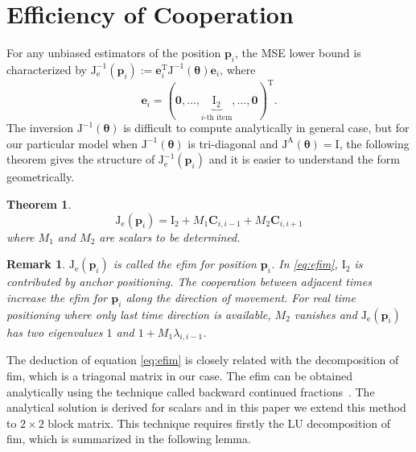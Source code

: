 \documentclass[conference]{IEEEtran}
\newtheorem{theorem}{Theorem}
\newtheorem{remark}{Remark}
\begin{document}
\section{Efficiency of Cooperation}\label{efficiency}
For any unbiased estimators of the position $\bm{p}_i$, the MSE lower bound is characterized by $\bm{\mathrm{J}}^{-1}_{\mathrm{e}}(\bm{p}_i):=\bm{e}_i^{\textrm{T}}\bm{\mathrm{J}}^{-1}(\bm{\theta})\bm{e}_i$, where
\begin{equation}
\bm{e}_i=(\bm{0},\dots,\underbrace{\bm{\mathrm{I}}_2}_{\text{$i$-th item}},\dots,\bm{0})^{\textrm{T}}.
\end{equation}
The inversion $\bm{\mathrm{J}}^{-1}(\bm{\theta})$ is difficult to compute analytically in general case, but for our particular model when $\bm{\mathrm{J}}^{-1}(\bm{\theta})$ is tri-diagonal and $\bm{\mathrm{J}}^\mathrm{A}(\bm{\theta})= \bm{\mathrm{I}}$, the following theorem gives the structure of $\bm{\mathrm{J}}^{-1}_{\mathrm{e}}(\bm{p}_i)$ and it is easier to understand the form geometrically.
\begin{theorem}
\begin{equation}\label{eq:efim}
\bm{\mathrm{J}}_{\mathrm{e}}(\bm{p}_i)=\bm{\mathrm{I}}_2+M_1 \bm{C}_{i,i-1} +M_2 \bm{C}_{i,i+1}
\end{equation}
where $M_1$ and $M_2$ are scalars to be determined.
\end{theorem}
\begin{remark}
$\bm{\mathrm{J}}_{\mathrm{e}}(\bm{p}_i)$ is called the \ac{efim} for position $\bm{p}_i$\cite{LimitBound2}.
In \eqref{eq:efim}, $\bm{\mathrm{I}}_2$ is contributed by anchor positioning. 
The cooperation between adjacent times increase the \ac{efim} for $\bm{p}_i$ along the direction of movement. For real time positioning where only last time direction is available, $M_2$ vanishes and $\bm{\mathrm{J}}_{\mathrm{e}}(\bm{p}_i)$ 
has two eigenvalues $1$ and $1+M_1\lambda_{i,i-1}$.
\end{remark}
The deduction of equation \eqref{eq:efim} is closely related with the decomposition of \ac{fim}, which is a triagonal matrix in our case. 
The \ac{efim} can be obtained analytically using the technique called backward continued fractions~\cite{K2008Explicit}. 
The analytical solution is derived for scalars and in this paper we extend this method to $2\times 2$ block matrix. 
This technique requires firstly the LU decomposition of \ac{fim}, which is summarized in the following lemma.
\end{document}
